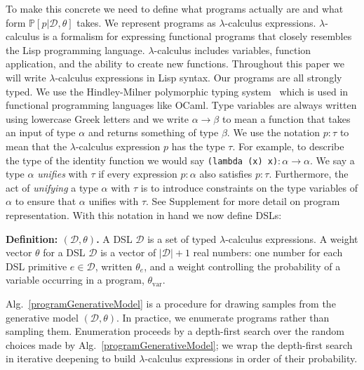 \documentclass{article}
\newcommand{\code}[1]{{\footnotesize\texttt{#1}}}
\newcommand{\probability}{\mathds{P}} %
\begin{document}
To make this concrete we need to define what programs actually are and
what form $\probability[p |\mathcal{D},\theta]$ takes.
We represent programs as $\lambda$-calculus expressions.
$\lambda$-calculus is a formalism for expressing functional programs
that closely resembles the Lisp programming language.
$\lambda$-calculus includes variables, function application, and the ability to create new functions.
Throughout this paper we will write $\lambda$-calculus expressions in Lisp syntax.
Our programs are all strongly typed.
We use the Hindley-Milner polymorphic typing system~\cite{pierce} which is
used in functional programming languages like OCaml.
Type variables are always written using lowercase Greek letters
and we write $\alpha\to \beta$ to mean a function that takes an input of type $\alpha$
and returns something of type $\beta$.
We use the notation $p:\tau$ to mean that the $\lambda$-calculus expression $p$
has the type $\tau$.
For example, to describe the type of the identity function
we would say \code{(lambda (x) x)}$:\alpha\to \alpha$.
We say a type $\alpha$ \emph{unifies} with $\tau$ if every expression
$p:\alpha$ also satisfies $p:\tau$. Furthermore, the act of \emph{unifying}
a type $\alpha$ with $\tau$ is to introduce constraints on the type
variables of $\alpha$ to ensure that $\alpha$ unifies with $\tau$.
See Supplement for more detail on program representation.
With this notation in hand we now define DSLs:

\noindent\textbf{Definition: $(\mathcal{D},\theta)$.}
A DSL $\mathcal{D}$ is a set of typed $\lambda$-calculus expressions.
A weight vector $\theta$ for a DSL $\mathcal{D}$ is a vector of $|\mathcal{D}| + 1$ real numbers:
one number for each DSL primitive $e\in \mathcal{D}$, written $\theta_e$,
and a weight controlling the probability of a variable occurring in a program, $\theta_{\text{var}}$.

Alg.~\ref{programGenerativeModel} is a procedure for drawing
samples from the generative model $(\mathcal{D},\theta)$.  In practice, we
enumerate programs rather than sampling them.  Enumeration proceeds by
a depth-first search over the random choices made by
Alg.~\ref{programGenerativeModel}; we wrap the depth-first search
in iterative deepening to build $\lambda$-calculus
expressions in order of their probability.
\end{document}
